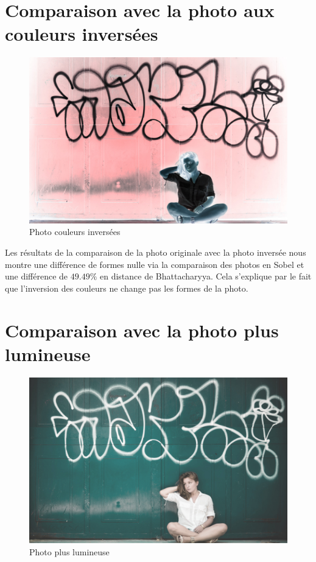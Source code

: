 \documentclass[]{article}
\begin{document}
\section{Comparaison avec la photo aux couleurs
inversées}\label{comparaison-avec-la-photo-aux-couleurs-inversuxe9es}

\begin{figure}[htbp]
\centering
\includegraphics{photos/inverse.jpg}
\caption{Photo couleurs inversées}
\end{figure}

Les résultats de la comparaison de la photo originale avec la photo
inversée nous montre une différence de formes nulle via la comparaison
des photos en Sobel et une différence de $49.49\%$ en distance de
Bhattacharyya. Cela s'explique par le fait que l'inversion des couleurs
ne change pas les formes de la photo.

\newpage

\section{Comparaison avec la photo plus
lumineuse}\label{comparaison-avec-la-photo-plus-lumineuse}

\begin{figure}[htbp]
\centering
\includegraphics{photos/lumineux.jpg}
\caption{Photo plus lumineuse}
\end{figure}
\end{document}
